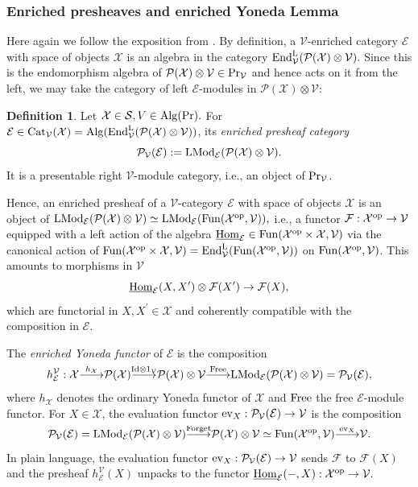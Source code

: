 \documentclass[10pt]{amsart}
\theoremstyle{definition}
\newtheorem{definition}[equation]{Definition}
\theoremstyle{remark}
\def\lomapr#1{\smash{\mathop{\relbar\joinrel\longrightarrow}\limits^{#1}}}
\newcommand{\uHom}{\underline{{\rm{Hom}} }}
\newcommand{\LL}{\operatorname{L} }
\newcommand{\sff}{{\mathcal{F}}}
\newcommand{\sv}{{\mathcal{V}}}
\newcommand{\se}{{\mathcal{E}}}
\newcommand{\sx}{{\mathcal{X}}}
\newcommand{\sss}{{\mathcal{S}}}
\newcommand{\spp}{{\mathcal{P}}}
\numberwithin{equation}{section}
\numberwithin{equation}{section}
\begin{document}
\subsubsection{Enriched presheaves and enriched  Yoneda Lemma} Here again we follow the exposition from \cite[Sec. 2.6]{RZ}.  By definition, a $\sv$-enriched
category $\se$ with space of objects $\sx$ is an algebra in the category
${\rm End}^{\LL}_{\sv}(\spp(\sx)\otimes \sv). $ Since this is the endomorphism algebra of  $\spp(\sx)\otimes \sv \in  {\rm Pr}_{\sv}$ and
hence acts on it  from the left, we may take the category of left $\se$-modules
in $\spp(\sx) \otimes \sv$:
\begin{definition} \label{def3} Let  $\sx \in \sss, V \in  {\rm Alg}({\rm Pr}).$ For  $\se \in  {\rm Cat}_{\sv}(\sx)= {\rm Alg}({\rm End}^{\LL}_\sv(\spp(\sx) \otimes  \sv))$,
its {\em enriched presheaf category} 
$$\spp_{\sv}(\se) := {\rm LMod}_{\se}(\spp(\sx) \otimes  \sv).$$  It is a presentable right $\sv$-module category, i.e.,  an object of ${\rm Pr}_{\sv}$.
\end{definition}
Hence, an enriched presheaf of a $\sv$-category $\se$ with
space of objects $\sx$ is  an object of ${\rm LMod}_{\se}(\spp(\sx) \otimes \sv) \simeq  {\rm LMod}_{\se}({\rm Fun}(\sx^{\rm op}, \sv)),$
i.e., a functor $\sff : \sx^{\rm op}\to \sv$  equipped  with a left action of the algebra 
 $\uHom_{\se} \in {\rm Fun}(\sx^{\rm op} \times  \sx, \sv)$  via the canonical action of $ {\rm Fun}(\sx^{\rm op} \times  \sx, \sv) = {\rm End}^{\LL}_{\sv}({\rm Fun}(\sx^{\rm op}, \sv)) $ on
${\rm Fun}(\sx^{\rm op}, \sv)$. This amounts to morphisms in
 $ \sv$
$$\uHom_{\se}(X, X^{\prime}) \otimes \sff(X^{\prime}) \to \sff(X),$$
which are functorial  in $ X, X^{\prime} \in  \sx$ and coherently compatible with the composition in $\se$.
 
    The {\em enriched Yoneda functor} of $\se$ is the composition
$$h^{\sv}_{\se} : \sx\lomapr{h_{\sx}} \spp(\sx)
\lomapr{{\rm Id}\otimes 1_{\sv}} \spp(\sx) \otimes \sv\lomapr{\rm Free} {\rm  LMod}_{\se}(\spp(\sx)\otimes \sv) = \spp_{\sv}(\se),$$
where $h_{\sx}$ denotes the ordinary Yoneda functor of $\sx$ and ${\rm Free}$  the free $\se$-module functor.
 For $X \in  \sx$, 
 the evaluation functor ${\rm ev}_X : \spp_{\sv}(\se) \to \sv $ is  the composition
$$\spp_{\sv}(\se) = {\rm LMod}_{\se}(\spp(\sx) \otimes \sv)\lomapr{\rm Forget}
 \spp(\sx) \otimes  \sv \simeq  {\rm Fun}(\sx^{\rm op}, \sv) \lomapr{{\rm ev}_X} \sv.$$
In plain language, the evaluation functor ${\rm ev}_X : \spp_{\sv}(\se) \to  \sv$ sends $\sff$ to $\sff(X)$
and the  presheaf $h^{\sv}_{\se}(X) $ unpacks to the functor $\uHom_{\se}(-, X) : \sx^{\rm op} \to  \sv.$
 
\end{document}
